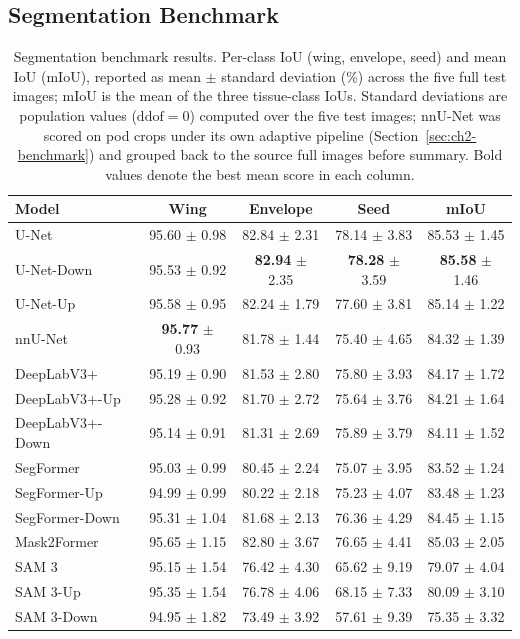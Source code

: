 \subsection{Segmentation Benchmark}
\begin{table}[htbp]
 \centering
 \caption[Segmentation benchmark results]{Segmentation benchmark results. Per-class IoU (wing, envelope, seed) and mean IoU (mIoU), reported as mean $\pm$ standard deviation (\%) across the five full test images; mIoU is the mean of the three tissue-class IoUs. Standard deviations are population values ($\mathrm{ddof}=0$) computed over the five test images; nnU-Net was scored on pod crops under its own adaptive pipeline (Section~\ref{sec:ch2-benchmark}) and grouped back to the source full images before summary. Bold values denote the best mean score in each column.}\label{tab:ch2-pennycress-results}
 \small
 \setlength{\tabcolsep}{3.5pt}
 \renewcommand{\arraystretch}{1.1}
 \begin{tabular}{@{}lcccc@{}}
 \toprule
 Model & Wing & Envelope & Seed & mIoU \\
 \midrule
 U-Net & 95.60 $\pm$ 0.98 & 82.84 $\pm$ 2.31 & 78.14 $\pm$ 3.83 & 85.53 $\pm$ 1.45 \\
 U-Net-Down & 95.53 $\pm$ 0.92 & \textbf{82.94} $\pm$ 2.35 & \textbf{78.28} $\pm$ 3.59 & \textbf{85.58} $\pm$ 1.46 \\
 U-Net-Up & 95.58 $\pm$ 0.95 & 82.24 $\pm$ 1.79 & 77.60 $\pm$ 3.81 & 85.14 $\pm$ 1.22 \\
 nnU-Net & \textbf{95.77} $\pm$ 0.93 & 81.78 $\pm$ 1.44 & 75.40 $\pm$ 4.65 & 84.32 $\pm$ 1.39 \\
 DeepLabV3+ & 95.19 $\pm$ 0.90 & 81.53 $\pm$ 2.80 & 75.80 $\pm$ 3.93 & 84.17 $\pm$ 1.72 \\
 DeepLabV3+-Up & 95.28 $\pm$ 0.92 & 81.70 $\pm$ 2.72 & 75.64 $\pm$ 3.76 & 84.21 $\pm$ 1.64 \\
 DeepLabV3+-Down & 95.14 $\pm$ 0.91 & 81.31 $\pm$ 2.69 & 75.89 $\pm$ 3.79 & 84.11 $\pm$ 1.52 \\
 SegFormer & 95.03 $\pm$ 0.99 & 80.45 $\pm$ 2.24 & 75.07 $\pm$ 3.95 & 83.52 $\pm$ 1.24 \\
 SegFormer-Up & 94.99 $\pm$ 0.99 & 80.22 $\pm$ 2.18 & 75.23 $\pm$ 4.07 & 83.48 $\pm$ 1.23 \\
 SegFormer-Down & 95.31 $\pm$ 1.04 & 81.68 $\pm$ 2.13 & 76.36 $\pm$ 4.29 & 84.45 $\pm$ 1.15 \\
 Mask2Former & 95.65 $\pm$ 1.15 & 82.80 $\pm$ 3.67 & 76.65 $\pm$ 4.41 & 85.03 $\pm$ 2.05 \\
 SAM 3 & 95.15 $\pm$ 1.54 & 76.42 $\pm$ 4.30 & 65.62 $\pm$ 9.19 & 79.07 $\pm$ 4.04 \\
 SAM 3-Up & 95.35 $\pm$ 1.54 & 76.78 $\pm$ 4.06 & 68.15 $\pm$ 7.33 & 80.09 $\pm$ 3.10 \\
 SAM 3-Down & 94.95 $\pm$ 1.82 & 73.49 $\pm$ 3.92 & 57.61 $\pm$ 9.39 & 75.35 $\pm$ 3.32 \\
 \bottomrule
 \end{tabular}
\end{table}

